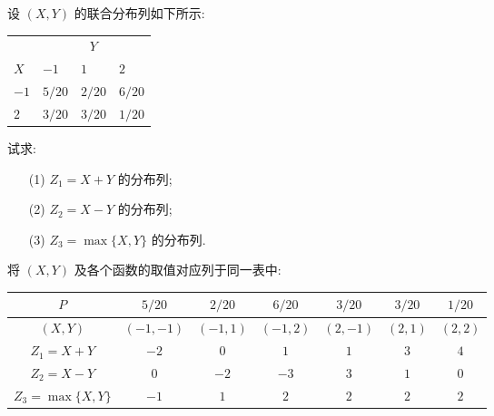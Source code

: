    \begin{example}\label{exam:3.3.1}
   	设 $(X,Y)$ 的联合分布列如下所示:
   	\begin{center}
   		\begin{tabularx}{0.8\textwidth}{ZZZZ}
   			\hline
   			&  \\
   			$X$ & $-1$ & $1$ & $2$\\
   			\hline
   			$-1$ & $5/20$ & $2/20$ & $6/20$\\
   			$2$ & $3/20$ & $3/20$ & $1/20$\\
   			\hline
   		\end{tabularx}
   	\end{center}
   	试求:
   	\begin{itemize}
   		\item[(1)] $Z_1=X+Y$ 的分布列;
   		\item[(2)] $Z_2=X-Y$ 的分布列;
   		\item[(3)] $Z_3=\max\{X,Y\}$ 的分布列.
   	\end{itemize}
   	\begin{solution}
   		将 $(X,Y)$ 及各个函数的取值对应列于同一表中:
   		\begin{center}
   			\begin{tabular}{c|cccccc}
   				\hline
   				$P$ & $5/20$ & $2/20$ & $6/20$ & $3/20$ & $3/20$ & $1/20$\\
   				\hline
   				$(X,Y)$ & $(-1,-1)$ & $(-1,1)$ & $(-1,2)$ & $(2,-1)$ & $(2,1)$ & $(2,2)$\\
   				\hline
   				$Z_1=X+Y$ & $-2$ & $0$ & $1$ & $1$ & $3$ & $4$\\
   				\hline
   				$Z_2=X-Y$ & $0$ & $-2$ & $-3$ & $3$ & $1$ & $0$\\
   				\hline
   				$Z_3=\max\{X,Y\}$ & $-1$ & $1$ & $2$ & $2$ & $2$ & $2$\\
   				\hline
   			\end{tabular}
   		\end{center}
   		

\end{solution}
\end{example}
